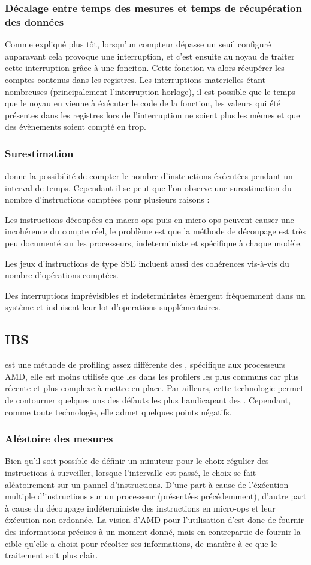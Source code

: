 					\subsubsection{Décalage entre temps des mesures et temps de récupération des données}
						Comme expliqué plus tôt, lorsqu'un compteur dépasse un seuil configuré auparavant cela provoque une interruption, et c'est ensuite au noyau de traiter cette interruption grâce à une fonciton. Cette fonction va alors récupérer les comptes contenus dans les registres. Les interruptions materielles étant nombreuses (principalement l'interruption horloge), il est possible que le temps que le noyau en vienne à éxécuter le code de la fonction, les valeurs qui été présentes dans les registres lors de l'interruption ne soient plus les mêmes et que des évènements soient compté en trop.
					\subsubsection{Surestimation}
						\PMC donne la possibilité de compter le nombre d'instructions éxécutées pendant un interval de temps. Cependant il se peut que l'on observe une surestimation du nombre d'instructions comptées pour plusieurs raisons : 
						\bitem
							\item{Les instructions découpées en macro-ops puis en micro-ops peuvent causer une incohérence du compte réel, le problème est que la méthode de découpage est très peu documenté sur les processeurs, indeterministe et spécifique à chaque modèle.}
							\item{Les jeux d'instructions de type SSE incluent aussi des cohérences vis-à-vis du nombre d'opérations comptées.}
							\item{Des interruptions imprévisibles et indeterministes émergent fréquemment dans un système et induisent leur lot d'operations supplémentaires.}
						\eitem
				\subsection{IBS}
					\IBS est une méthode de profiling assez différente des \PMC, spécifique aux processeurs AMD, elle est moins utilisée que les \PMC dans les profilers les plus communs car plus récente et plus complexe à mettre en place. Par ailleurs, cette technologie permet de contourner quelques uns des défauts les plus handicapant des \PMC. Cependant, comme toute technologie, elle admet quelques points négatifs.
					\subsubsection{Aléatoire des mesures}
						Bien qu'il soit possible de définir un minuteur pour le choix régulier des instructions à surveiller, lorsque l'intervalle est passé, le choix se fait aléatoirement sur un pannel d'instructions. D'une part à cause de l'éxécution multiple d'instructions sur un processeur (présentées précédemment), d'autre part à cause du découpage indéterministe des instructions en micro-ops et leur éxécution non ordonnée. La vision d'AMD pour l'utilisation d'\IBS est donc de fournir des informations précises à un moment donné, mais en contrepartie de fournir la cible qu'elle a choisi pour récolter ses informations, de manière à ce que le traitement soit plus clair.

